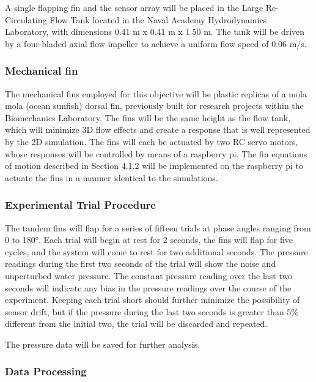     A single flapping fin and the sensor array will be placed in the Large Re-Circulating Flow Tank located in the Naval Academy Hydrodynamics Laboratory, with dimensions 0.41 m x 0.41 m x 1.50 m. The tank will be driven by a four-bladed axial flow impeller to achieve a uniform flow speed of 0.06 m/s.

\subsubsection{Mechanical fin} \label{Mechanical fin}

    The mechanical fins employed for this objective will be plastic replicas of a mola mola (ocean sunfish) dorsal fin, previously built for research projects within the Biomechanics Laboratory. The fins will be the same height as the flow tank, which will minimize 3D flow effects and create a response that is well represented by the 2D simulation. The fins will each be actuated by two RC servo motors, whose responses will be controlled by means of a raspberry pi. The fin equations of motion described in Section 4.1.2 will be implemented on the raspberry pi to actuate the fins in a manner identical to the simulations.

\subsubsection{Experimental Trial Procedure} \label{Experimental Trial Procedure}

    The tandem fins will flap for a series of fifteen trials at phase angles ranging from 0 to 180°. Each trial will begin at rest for 2 seconds,  the fins will flap for five cycles, and the system will come to rest for two additional seconds. The pressure readings during the first two seconds of the trial will show the noise and unperturbed water pressure. The constant pressure reading over the last two seconds will indicate any bias in the pressure readings over the course of the experiment. Keeping each trial short should further minimize the possibility of sensor drift, but if the pressure during the last two seconds is greater than 5\% different from the initial two, the trial will be discarded and repeated.

    The pressure data will be saved for further analysis. 
    
\subsubsection{Data Processing} \label{Data Processing}
    
